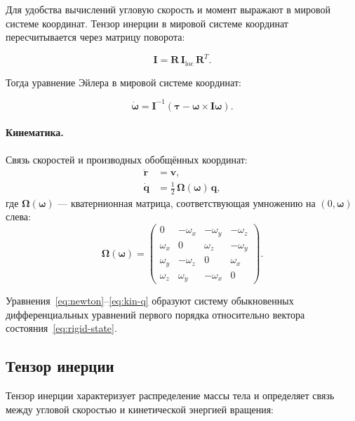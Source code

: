 Для удобства вычислений угловую скорость и момент выражают в мировой системе координат. Тензор инерции в 
мировой системе координат пересчитывается через матрицу поворота:

\begin{equation}
  \mathbf{I} = \mathbf{R}\,\mathbf{I}_{\text{loc}}\,\mathbf{R}^T.
\end{equation}

Тогда уравнение Эйлера в мировой системе координат:

\begin{equation}
  \dot{\boldsymbol{\omega}} = \mathbf{I}^{-1}\!\left(\boldsymbol{\tau} - \boldsymbol{\omega} \times \mathbf{I}\boldsymbol{\omega}\right).
  \label{eq:euler-world}
\end{equation}

\paragraph{Кинематика.}
Связь скоростей и производных обобщённых координат:
\begin{align}
  \dot{\mathbf{r}} &= \mathbf{v}, \label{eq:kin-r}\\
  \dot{\mathbf{q}} &= \tfrac{1}{2}\,\boldsymbol{\Omega}(\boldsymbol{\omega})\,\mathbf{q}, \label{eq:kin-q}
\end{align}
где $\boldsymbol{\Omega}(\boldsymbol{\omega})$ --- кватернионная матрица, соответствующая умножению на $(0,\boldsymbol{\omega})$ слева:
\begin{equation}
  \boldsymbol{\Omega}(\boldsymbol{\omega}) =
  \begin{pmatrix}
    0 & -\omega_x & -\omega_y & -\omega_z \\
    \omega_x & 0 & \omega_z & -\omega_y \\
    \omega_y & -\omega_z & 0 & \omega_x \\
    \omega_z & \omega_y & -\omega_x & 0
  \end{pmatrix}.
\end{equation}

Уравнения~\eqref{eq:newton}–\eqref{eq:kin-q} образуют систему обыкновенных дифференциальных уравнений первого 
порядка относительно вектора состояния~\eqref{eq:rigid-state}.

\subsection{Тензор инерции}

Тензор инерции характеризует распределение массы тела и определяет связь между угловой скоростью и 
кинетической энергией вращения:

